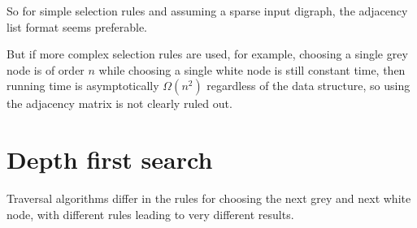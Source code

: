 So for simple selection rules and assuming a sparse input digraph, the adjacency list format seems
preferable. 

But if more complex selection rules are used, for example, choosing a single grey node is 
of order $n$ while choosing a single white node is still constant time, then running time is 
asymptotically $\Omega(n^2)$ regardless of the data structure, so using
the adjacency matrix is not clearly ruled out.

%
%
%

\chapter{Depth first search} %

Traversal algorithms differ in the rules for choosing the next grey and next white node, with  different rules leading
to very different results.

